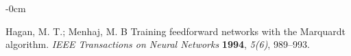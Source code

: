 \documentclass[journal,article,submit,pdftex,moreauthors]{Definitions/mdpi}
\begin{document}
\begin{adjustwidth}{-\extralength}{0cm}
\begin{thebibliography}{999}
Hagan, M. T.; Menhaj, M. B Training feedforward networks with the Marquardt algorithm. {\em IEEE Transactions on Neural Networks} {\bf 1994}, {\em 5(6)}, 989--993.






\end{thebibliography}

%


\PublishersNote{}
\end{adjustwidth}
\end{document}

